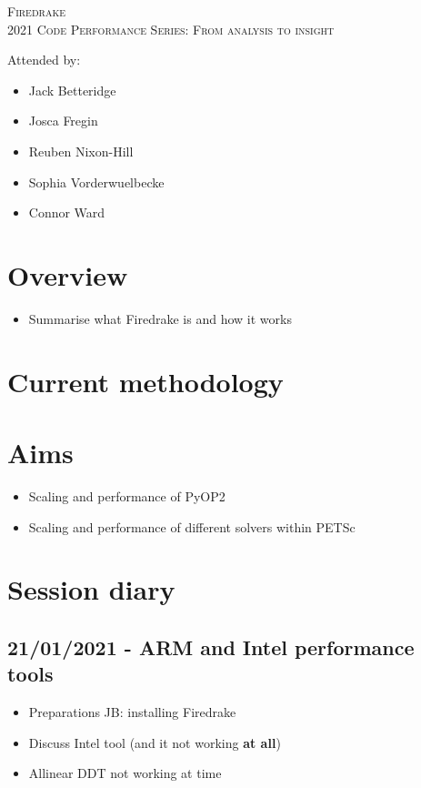 \documentclass[a4paper,11pt]{article}
\author{Jack Betteridge}
\newenvironment{jacknotes}{\color{red}\renewcommand{\labelitemi}{$\star$}\begin{itemize}}{\end{itemize}}
\begin{document}
\begin{center}
\textsc{\Large Firedrake}\\
\textsc{2021 Code Performance Series: From analysis to insight}
\end{center}

Attended by:
\begin{itemize}
	\item Jack Betteridge
	\item Josca Fregin
	\item Reuben Nixon-Hill
	\item Sophia Vorderwuelbecke
	\item Connor Ward
\end{itemize}

\section{Overview}
\label{sec:overview}
\begin{jacknotes}
	\item Summarise what Firedrake is and how it works
\end{jacknotes}

\section{Current methodology}
\label{sec:current}


\section{Aims}
\label{sec:aims}
\begin{jacknotes}
	\item Scaling and performance of PyOP2
	\item Scaling and performance of different solvers within PETSc
\end{jacknotes}


\clearpage
\section{Session diary}
\label{sec:diary}
\subsection*{21/01/2021 - ARM and Intel performance tools}
\label{ssec:arm_intel}
\begin{jacknotes}
	\item Preparations JB: installing Firedrake
	\item Discuss Intel tool (and it not working \textbf{at all})
	\item Allinear DDT not working at time
\end{jacknotes}
\end{document}

